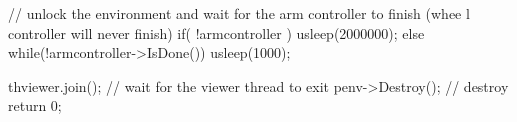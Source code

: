 \begin{DoxyCodeInclude}
{{        // unlock the environment and wait for the arm controller to finish (whee
      l controller will never finish)
        if( !armcontroller ) {
            usleep(2000000);
        }
        else {
            while(!armcontroller->IsDone()) {
                usleep(1000);
            }
        }
    }

    thviewer.join(); // wait for the viewer thread to exit
    penv->Destroy(); // destroy
    return 0;
}
\end{DoxyCodeInclude}
 